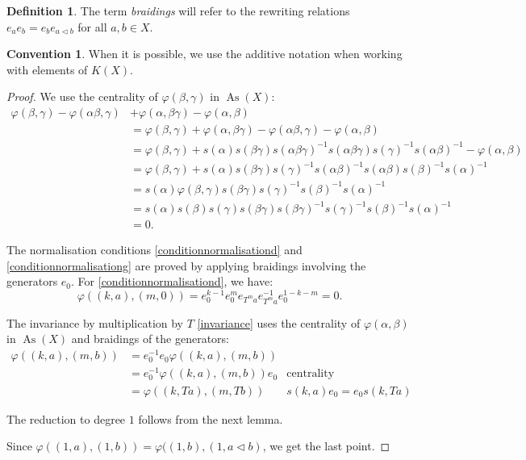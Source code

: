 \documentclass[a4paper,11pt]{amsart}
\theoremstyle{definition}
\newtheorem{definition}[thm]{Definition}
\newtheorem{convention}[thm]{Convention}
\DeclareMathOperator{\As}{As}
\begin{document}
\begin{definition}
The term \emph{braidings} will refer to the rewriting relations $e_a e_b = e_b e_{a\lhd b}$ for all $a,b\in X$.
\end{definition}

\begin{convention}
When it is possible, we use the additive notation when working with elements of $K(X)$.
\end{convention}

\begin{proof}
We use the centrality of $\varphi(\beta,\gamma)$ in $\As(X)$:
\begin{align*}
\varphi(\beta,\gamma) - \varphi(\alpha \beta, \gamma) & + \varphi(\alpha,\beta\gamma) - \varphi(\alpha, \beta)\\
& = \varphi(\beta,\gamma) + \varphi(\alpha,\beta\gamma) - \varphi(\alpha \beta, \gamma)  - \varphi(\alpha, \beta) \\
& = \varphi(\beta,\gamma)  + s(\alpha) s(\beta \gamma) s(\alpha \beta \gamma)^{-1} s(\alpha\beta\gamma)s(\gamma)^{-1} s(\alpha\beta)^{-1} - \varphi(\alpha,\beta) \\
& = \varphi(\beta,\gamma) + s(\alpha) s(\beta\gamma) s(\gamma)^{-1} s(\alpha\beta)^{-1} s(\alpha\beta) s(\beta)^{-1} s(\alpha)^{-1} \\
& = s(\alpha) \varphi(\beta,\gamma) s(\beta \gamma) s(\gamma)^{-1} s(\beta)^{-1} s(\alpha)^{-1} \\
& = s(\alpha) s(\beta) s(\gamma) s(\beta \gamma) s(\beta \gamma)^{-1} s(\gamma)^{-1} s(\beta)^{-1} s(\alpha)^{-1}\\
& = 0.
\end{align*}

The normalisation conditions \eqref{conditionnormalisationd} and \eqref{conditionnormalisationg} are proved by applying braidings involving the generators $e_0$.
For \eqref{conditionnormalisationd}, we have:
\[
\varphi((k,a),(m,0)) = e_0^{k-1} e_0^{m} e_{T^m a} e_{T^m a}^{-1} e_0^{1-k-m} = 0.
\]

The invariance by multiplication by $T$ \eqref{invariance} uses the centrality of $\varphi(\alpha,\beta)$ in $\As(X)$ and braidings of the generators:
\begin{align*}
\varphi((k,a), (m,b)) & = e_0^{-1} e_0 \varphi((k,a), (m,b)) \\
& = e_0^{-1} \varphi((k,a), (m,b)) e_0 & \text{centrality} \\
& = \varphi((k,Ta), (m,Tb)) & s(k,a)e_0 = e_0 s(k,Ta)
\end{align*}

The reduction to degree $1$ follows from the next lemma.

Since $\varphi((1,a),(1,b)) = \varphi((1,b), (1,a\lhd b)$, we get the last point.
\end{proof}
\end{document}
